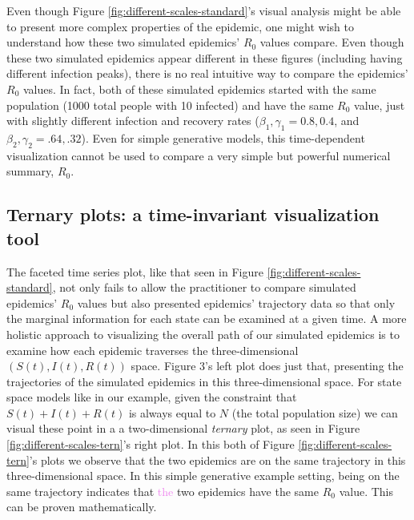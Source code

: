 \documentclass[
  shortnames]{jss}
\begin{document}
Even though Figure \ref{fig:different-scales-standard}'s visual analysis
might be able to present more complex properties of the epidemic, one
might wish to understand how these two simulated epidemics' \(R_0\)
values compare. Even though these two simulated epidemics appear
different in these figures (including having different infection peaks),
there is no real intuitive way to compare the epidemics' \(R_0\) values.
In fact, both of these simulated epidemics started with the same
population (1000 total people with 10 infected) and have the same
\(R_0\) value, just with slightly different infection and recovery rates
(\(\beta_1, \gamma_1 = 0.8, 0.4\), and
\(\beta_2, \gamma_2 = .64, .32\)). Even for simple generative models,
this time-dependent visualization cannot be used to compare a very
simple but powerful numerical summary, \(R_0\).

\hypertarget{ternary-plots-a-time-invariant-visualization-tool}{%
\subsection{Ternary plots: a time-invariant visualization
tool}\label{ternary-plots-a-time-invariant-visualization-tool}}

The faceted time series plot, like that seen in Figure
\ref{fig:different-scales-standard}, not only fails to allow the
practitioner to compare simulated epidemics' \(R_0\) values but also
presented epidemics' trajectory data so that only the marginal
information for each state can be examined at a given time. A more
holistic approach to visualizing the overall path of our simulated
epidemics is to examine how each epidemic traverses the
three-dimensional \((S(t),I(t),R(t))\) space. Figure 3's left plot does
just that, presenting the trajectories of the simulated epidemics in
this three-dimensional space. For state space models like in our
example, given the constraint that \(S(t) + I(t)+R(t)\) is always equal
to \(N\) (the total population size) we can visual these point in a a
two-dimensional \textit{ternary} plot, as seen in Figure
\ref{fig:different-scales-tern}'s right plot. In this both of Figure
\ref{fig:different-scales-tern}'s plots we observe that the two
epidemics are on the same trajectory in this three-dimensional space. In
this simple generative example setting, being on the same trajectory
indicates that \textcolor{violet}{the} two epidemics have the same
\(R_0\) value. This can be proven mathematically.
\end{document}
